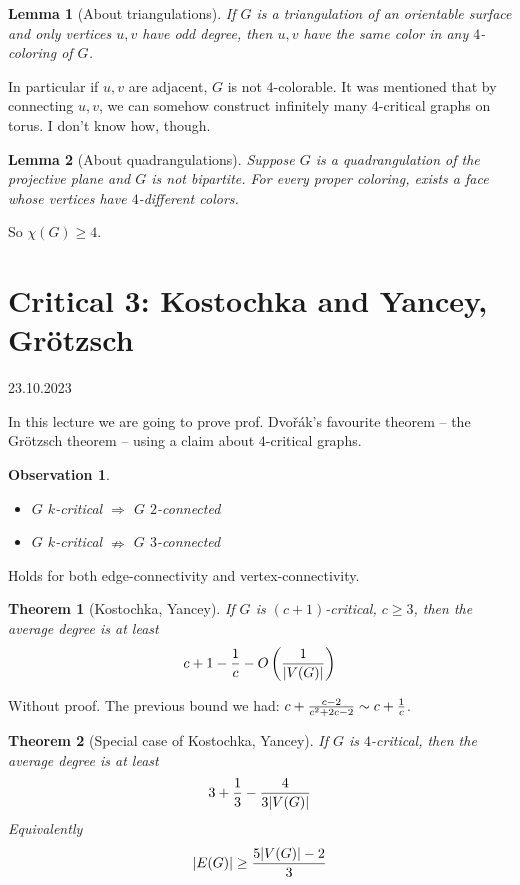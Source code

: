 \documentclass{article}
\newtheorem*{theorem}{Theorem}
\newtheorem*{lemma}{Lemma}
\newtheorem*{observation}{Observation}
\begin{document}
\begin{lemma}[About triangulations]
	If $G$ is a triangulation of an orientable surface and only vertices
	$u,v$ have odd degree, then $u,v$ have the same color in any
	$4$-coloring of $G$.
\end{lemma}

\noindent
In particular if $u,v$ are adjacent, $G$ is not $4$-colorable. It was mentioned
that by connecting $u,v$, we can somehow construct infinitely many $4$-critical
graphs on torus. I don't know how, though.

\begin{lemma}[About quadrangulations]
	Suppose $G$ is a quadrangulation of the projective plane and $G$ is not
	bipartite. For every proper coloring, exists a face whose vertices have
	$4$-different colors.
\end{lemma}

\noindent
So $\chi(G) \ge 4$.


\newpage
\section{Critical 3: Kostochka and Yancey, Grötzsch} %
23.10.2023

\noindent
In this lecture we are going to prove prof. Dvořák's favourite theorem -- the
Grötzsch theorem -- using a claim about $4$-critical graphs.

\begin{observation}
	~
	\begin{itemize}
		\item $G$ $k$-critical $\Rightarrow$ $G$ $2$-connected
		\item $G$ $k$-critical $\nRightarrow$ $G$ $3$-connected
	\end{itemize}
\end{observation}

\noindent
Holds for both edge-connectivity and vertex-connectivity.

\begin{theorem}[Kostochka, Yancey]
	If $G$ is $(c+1)$-critical, $c \ge 3$, then the average degree is at
	least
	$$c + 1 - {1 \over c} - O \left ( {1 \over {|V(G)|}} \right )$$
\end{theorem}

\noindent
Without proof. The previous bound we had: $c + {{c-2}\over{c^2 + 2c - 2}} \sim
c + {1 \over c}$.

\begin{theorem}[Special case of Kostochka, Yancey]
	If $G$ is $4$-critical, then the average degree is at least
	$$ 3 + {1 \over 3} - {4 \over {3|V(G)|}} $$
	Equivalently
	$$ |E(G)| \ge {{5|V(G)| - 2} \over 3} $$
\end{theorem}
\end{document}
